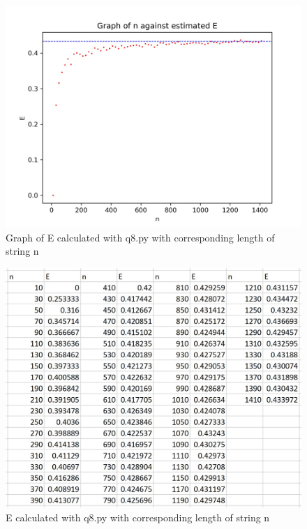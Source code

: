 \documentclass{article}
\begin{document}
	\begin{figure}[h]
		\centering
		\includegraphics{figures/q8_1.jpg}
		\caption{Graph of E calculated with q8.py with corresponding length of string n}
		\label{fig:Q8_1}
	\end{figure}
	
	\begin{figure}[h]
		\centering
		\includegraphics{figures/q8_2.jpg}
		\caption{E calculated with q8.py with corresponding length of string n}
		\label{fig:Q8_2}
	\end{figure}
	
	
	
\end{document}

